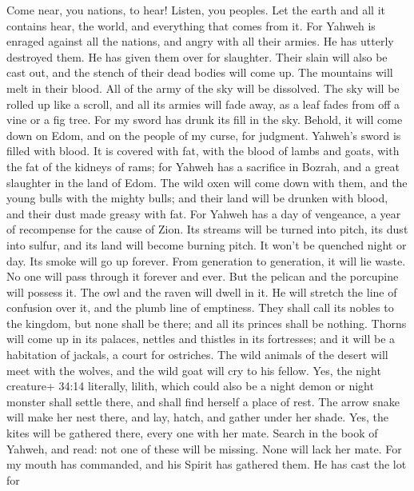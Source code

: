 Come near, you nations, to hear! Listen, you peoples. Let
the earth and all it contains hear, the world, and everything that comes
from it.  For Yahweh is enraged against all the nations, and
angry with all their armies. He has utterly destroyed them. He has given
them over for slaughter.  Their slain will also be cast out,
and the stench of their dead bodies will come up. The mountains will
melt in their blood.  All of the army of the sky will be
dissolved. The sky will be rolled up like a scroll, and all its armies
will fade away, as a leaf fades from off a vine or a fig tree.
 For my sword has drunk its fill in the sky. Behold, it will
come down on Edom, and on the people of my curse, for judgment.
 Yahweh's sword is filled with blood. It is covered with
fat, with the blood of lambs and goats, with the fat of the kidneys of
rams; for Yahweh has a sacrifice in Bozrah, and a great slaughter in the
land of Edom.  The wild oxen will come down with them, and
the young bulls with the mighty bulls; and their land will be drunken
with blood, and their dust made greasy with fat.  For Yahweh
has a day of vengeance, a year of recompense for the cause of Zion.
 Its streams will be turned into pitch, its dust into
sulfur, and its land will become burning pitch.  It won't
be quenched night or day. Its smoke will go up forever. From generation
to generation, it will lie waste. No one will pass through it forever
and ever.  But the pelican and the porcupine will possess
it. The owl and the raven will dwell in it. He will stretch the line of
confusion over it, and the plumb line of emptiness.  They
shall call its nobles to the kingdom, but none shall be there; and all
its princes shall be nothing.  Thorns will come up in its
palaces, nettles and thistles in its fortresses; and it will be a
habitation of jackals, a court for ostriches.  The wild
animals of the desert will meet with the wolves, and the wild goat will
cry to his fellow. Yes, the night creature+ 34:14 literally, lilith,
which could also be a night demon or night monster shall settle there,
and shall find herself a place of rest.  The arrow snake
will make her nest there, and lay, hatch, and gather under her shade.
Yes, the kites will be gathered there, every one with her mate.
 Search in the book of Yahweh, and read: not one of these
will be missing. None will lack her mate. For my mouth has commanded,
and his Spirit has gathered them.  He has cast the lot for
